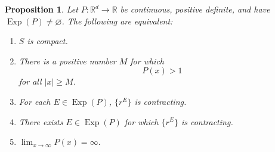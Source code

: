 \documentclass[11pt, letter]{book}
\newtheorem{proposition}[theorem]{Proposition}
\newcommand\Exp{\operatorname{Exp}}
\begin{document}
\begin{framed}
\begin{proposition}\label{prop:PositiveHomogeneousCharacterization}
Let $P:\mathbb{R}^d\to\mathbb{R}$ be continuous, positive definite, and have $\Exp(P)\neq \varnothing$. The following are equivalent:
\begin{enumerate}[label=(\alph*), ref=(\alph*)]
\item\label{cond:SisCompact} $S$ is compact.
\item\label{cond:PisAboveOne} There is a positive number $M$ for which
\begin{equation*}
P(x)>1
\end{equation*}
for all $|x|\geq M$. 
\item\label{cond:Contracting} For each $E\in\Exp(P)$, $\{r^E\}$ is contracting.
\item\label{cond:ThereExistsContracting} There exists $E\in\Exp(P)$ for which $\{r^E\}$ is contracting.
\item\label{cond:InfiniteLimit} $\lim_{x\to\infty}P(x)=\infty.$
\end{enumerate}
\end{proposition}
\end{framed}
\end{document}
